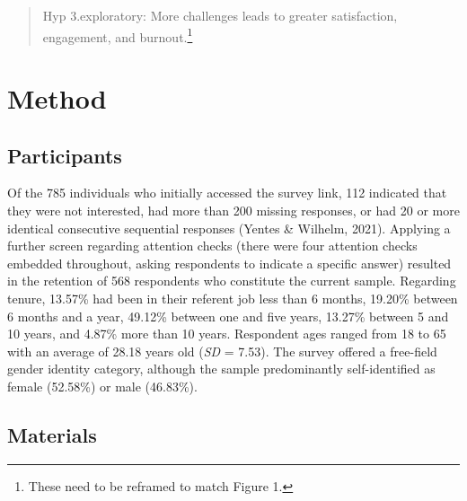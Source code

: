 \documentclass[
  jou,mask]{apa6}
\begin{document}
\begin{quote}
Hyp 3.exploratory: More challenges leads to greater satisfaction, engagement, and burnout.\footnote{These need to be reframed to match Figure 1.}
\end{quote}

\hypertarget{method}{%
\section{Method}\label{method}}

\hypertarget{participants}{%
\subsection{Participants}\label{participants}}

Of the 785 individuals who initially accessed the survey link, 112 indicated that they were not interested, had more than 200 missing responses, or had 20 or more identical consecutive sequential responses (Yentes \& Wilhelm, 2021). Applying a further screen regarding attention checks (there were four attention checks embedded throughout, asking respondents to indicate a specific answer) resulted in the retention of 568 respondents who constitute the current sample. Regarding tenure, 13.57\% had been in their referent job less than 6 months, 19.20\% between 6 months and a year, 49.12\% between one and five years, 13.27\% between 5 and 10 years, and 4.87\% more than 10 years. Respondent ages ranged from 18 to 65 with an average of 28.18 years old (\emph{SD} = 7.53). The survey offered a free-field gender identity category, although the sample predominantly self-identified as female (52.58\%) or male (46.83\%).

\hypertarget{materials}{%
\subsection{Materials}\label{materials}}
\end{document}
